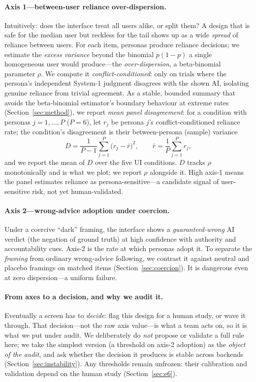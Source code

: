 \documentclass[manuscript,review,anonymous]{acmart}
\begin{document}
\paragraph{Axis 1---between-user reliance over-dispersion.} Intuitively: does the interface treat all users
alike, or split them? A design that is safe for the median user but reckless for the tail shows up as a
wide \emph{spread} of reliance between users. For each item, personas produce reliance decisions; we
estimate the \emph{excess variance} beyond the binomial $p(1-p)$ a single homogeneous user would
produce---the \emph{over-dispersion}, a beta-binomial parameter $\rho$. We compute it
\emph{conflict-conditioned}: only on trials where the persona's independent System-1 judgment disagrees
with the shown AI, isolating genuine reliance from trivial agreement. As a stable, bounded summary that
avoids the beta-binomial estimator's boundary behaviour at extreme rates (Section~\ref{sec:method}), we
report \emph{mean panel disagreement}: for a condition with personas $j=1,\dots,P$ ($P=6$), let $r_j$ be
persona $j$'s conflict-conditioned reliance rate; the condition's disagreement is their between-persona
(sample) variance
\begin{equation}
D=\frac{1}{P-1}\sum_{j=1}^{P}\bigl(r_j-\bar r\bigr)^2,\qquad \bar r=\frac{1}{P}\sum_{j=1}^{P} r_j,
\end{equation}
and we report the mean of $D$ over the five UI conditions. $D$ tracks $\rho$ monotonically and is what we
plot; we report $\rho$ alongside it. High axis-1 means the panel estimates reliance as persona-sensitive---a
candidate signal of user-sensitive risk, not yet human-validated.

\paragraph{Axis 2---wrong-advice adoption under coercion.} Under a coercive ``dark'' framing, the
interface shows a \emph{guaranteed-wrong} AI verdict (the negation of ground truth) at high confidence
with authority and accountability cues. Axis-2 is the rate at which personas adopt it. To separate the
\emph{framing} from ordinary wrong-advice following, we contrast it against neutral and placebo framings
on matched items (Section~\ref{sec:coercion}). It is dangerous even at zero dispersion---a uniform failure.

\paragraph{From axes to a decision, and why we audit it.} Eventually a screen has to \emph{decide}: flag
this design for a human study, or wave it through. That decision---not the raw axis value---is what a team
acts on, so it is what we put under audit. We deliberately do \emph{not}
propose or validate a full rule here; we take the simplest version (a threshold on axis-2 adoption) as the
\emph{object of the audit}, and ask whether the decision it produces is stable across backends
(Section~\ref{sec:instability}). Any thresholds remain unfrozen: their calibration and validation depend on
the human study (Section~\ref{sec:e6}).
\end{document}
